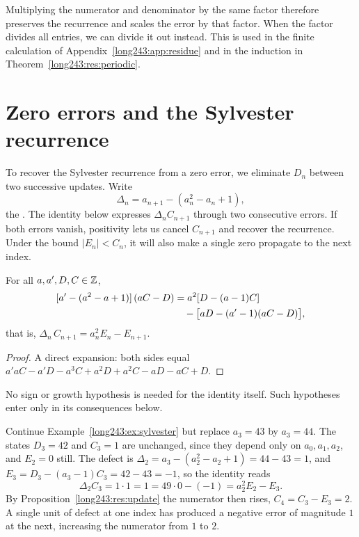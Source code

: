 \documentclass[11pt]{article}
\begin{document}
Multiplying the numerator and denominator by the same factor therefore
preserves the recurrence and scales the error by that factor. When the
factor divides all entries, we can divide it out instead. This is used
in the finite calculation of Appendix~\ref{long243:app:residue} and in
the induction in Theorem~\ref{long243:res:periodic}.

\section{Zero errors and the Sylvester recurrence}\label{long243:sec:defect}

To recover the Sylvester recurrence from a zero error, we eliminate
$D_n$ between two successive updates. Write
\[
 \Delta_n=a_{n+1}-(a_n^2-a_n+1),
\]
the
. The identity below expresses $\Delta_nC_{n+1}$ through two
consecutive errors. If both errors vanish, positivity lets us cancel
$C_{n+1}$ and recover the recurrence. Under the bound $|E_n|<C_n$, it will
also make a single zero propagate to the next index.

\begin{theorem}\label{long243:res:defect}
For all $a,a',D,C\in\mathbb{Z}$,
\[
 \begin{aligned}
 \relax[a'-(a^2-a+1)]\,(aC-D)
 &=a^2[D-(a-1)C]\\
 &\quad-\bigl[aD-(a'-1)(aC-D)\bigr],
 \end{aligned}
\]
that is, $\Delta_n\,C_{n+1}=a_n^{2}E_n-E_{n+1}$.
\end{theorem}

\begin{proof}
A direct expansion: both sides equal
$a'aC-a'D-a^{3}C+a^{2}D+a^{2}C-aD-aC+D$.
\end{proof}

 No sign or growth hypothesis is needed for the identity itself.
Such hypotheses enter only in its consequences below.

\begin{example}\label{long243:ex:defect}
Continue Example~\ref{long243:ex:sylvester} but replace $a_3=43$ by $a_3=44$.  The
states $D_3=42$ and $C_3=1$ are unchanged, since they depend only on
$a_0,a_1,a_2$, and $E_2=0$ still.  The defect is
$\Delta_2=a_3-(a_2^2-a_2+1)=44-43=1$, and
$E_3=D_3-(a_3-1)C_3=42-43=-1$, so the identity reads
\[
 \Delta_2C_3=1\cdot1=1=49\cdot0-(-1)=a_2^{2}E_2-E_3 .
\]
By Proposition~\ref{long243:res:update} the numerator then rises, $C_4=C_3-E_3=2$.  A
single unit of defect at one index has produced a negative error of magnitude
$1$ at the next, increasing the numerator from $1$ to $2$.
\end{example}
\end{document}
